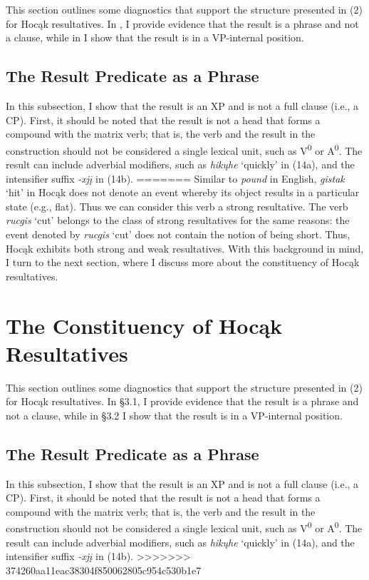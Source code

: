 \documentclass[output=paper]{LSP/langsci}
\begin{document}
\begin{exe}
\begin{exe}
This section outlines some diagnostics that support the structure presented in (2) for Hocąk resultatives. In , I provide evidence that the result is a phrase and not a clause, while in  I show that the result is in a VP-internal position.

\subsection{The Result Predicate as a Phrase}

In this subsection, I show that the result is an XP and is not a full clause (i.e., a CP). First, it should be noted that the result is not a head that forms a compound with the matrix verb; that is, the verb and the result in the construction should not be considered a single lexical unit, such as V\textsuperscript{0} or A\textsuperscript{0}. The result can include adverbial modifiers, such as \textit{hikųhe} `quickly' in (14a), and the intensifier suffix \textit{-xjį} in (14b).
=======
Similar to \textit{pound} in English, \textit{gistak} `hit' in Hoc\k{a}k does not denote an event whereby its object results in a particular state (e.g., flat). Thus we can consider this verb a strong resultative. The verb \textit{rucgis} `cut' belongs to the class of strong resultatives for the same reasons: the event denoted by \textit{rucgis} `cut' does not contain the notion of being short. Thus, Hoc\k{a}k exhibits both strong and weak resultatives. With this background in mind, I turn to the next section, where I discuss more about the constituency of Hoc\k{a}k resultatives.

\section{The Constituency of Hoc\k{a}k Resultatives}

This section outlines some diagnostics that support the structure presented in (2) for Hoc\k{a}k resultatives. In \S 3.1, I provide evidence that the result is a phrase and not a clause, while in \S 3.2 I show that the result is in a VP-internal position.

\subsection{The Result Predicate as a Phrase}

In this subsection, I show that the result is an XP and is not a full clause (i.e., a CP). First, it should be noted that the result is not a head that forms a compound with the matrix verb; that is, the verb and the result in the construction should not be considered a single lexical unit, such as V\textsuperscript{0} or A\textsuperscript{0}. The result can include adverbial modifiers, such as \textit{hik\k{u}he} `quickly' in (14a), and the intensifier suffix \textit{-xj\k{i}} in (14b).
>>>>>>> 374260aa11eac38304f850062805c954c530b1e7


\end{exe}
\end{exe}
\end{document}
